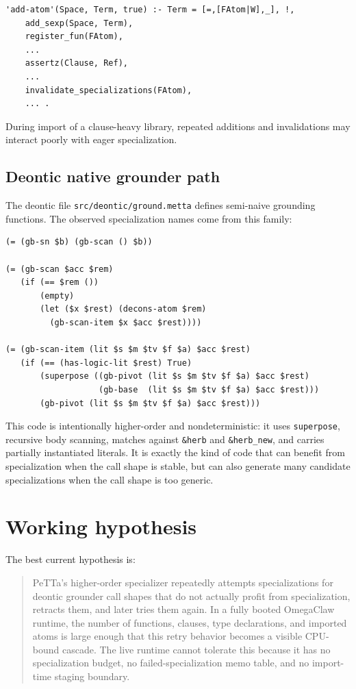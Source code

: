 \documentclass[11pt]{article}
\begin{document}
\begin{lstlisting}
'add-atom'(Space, Term, true) :- Term = [=,[FAtom|W],_], !,
    add_sexp(Space, Term),
    register_fun(FAtom),
    ...
    assertz(Clause, Ref),
    ...
    invalidate_specializations(FAtom),
    ... .
\end{lstlisting}

During import of a clause-heavy library, repeated additions and invalidations may interact poorly with eager specialization.

\subsection{Deontic native grounder path}

The deontic file \texttt{src/deontic/ground.metta} defines semi-naive grounding functions. The observed specialization names come from this family:

\begin{lstlisting}
(= (gb-sn $b) (gb-scan () $b))

(= (gb-scan $acc $rem)
   (if (== $rem ())
       (empty)
       (let ($x $rest) (decons-atom $rem)
         (gb-scan-item $x $acc $rest))))

(= (gb-scan-item (lit $s $m $tv $f $a) $acc $rest)
   (if (== (has-logic-lit $rest) True)
       (superpose ((gb-pivot (lit $s $m $tv $f $a) $acc $rest)
                   (gb-base  (lit $s $m $tv $f $a) $acc $rest)))
       (gb-pivot (lit $s $m $tv $f $a) $acc $rest)))
\end{lstlisting}

This code is intentionally higher-order and nondeterministic: it uses \texttt{superpose}, recursive body scanning, matches against \texttt{\&herb} and \texttt{\&herb\_new}, and carries partially instantiated literals. It is exactly the kind of code that can benefit from specialization when the call shape is stable, but can also generate many candidate specializations when the call shape is too generic.

\section{Working hypothesis}

The best current hypothesis is:

\begin{quote}
PeTTa's higher-order specializer repeatedly attempts specializations for deontic grounder call shapes that do not actually profit from specialization, retracts them, and later tries them again. In a fully booted OmegaClaw runtime, the number of functions, clauses, type declarations, and imported atoms is large enough that this retry behavior becomes a visible CPU-bound cascade. The live runtime cannot tolerate this because it has no specialization budget, no failed-specialization memo table, and no import-time staging boundary.
\end{quote}
\end{document}
